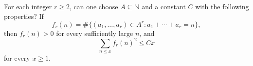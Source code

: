 For each integer $r\geq2$, can one choose $A\subseteq\mathbb N$ and a constant $C$ with the following properties? If
\[f_r(n)=\#\{(a_1,\ldots,a_r)\in A^r:a_1+\cdots+a_r=n\},\]
then $f_r(n)>0$ for every sufficiently large $n$, and
\[\sum_{n\leq x}f_r(n)^2\leq Cx\]
for every $x\geq1$.
